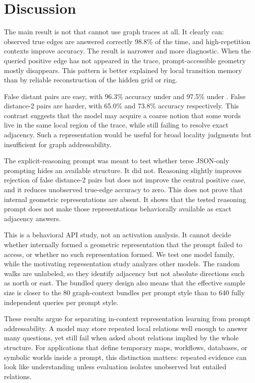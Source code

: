\section{Discussion}
\label{sec:discussion}

The main result is not that \gptfourone cannot use graph traces at all. It clearly can: observed true edges are answered correctly 98.8\% of the time, and high-repetition contexts improve accuracy. The result is narrower and more diagnostic. When the queried positive edge has not appeared in the trace, prompt-accessible geometry mostly disappears. This pattern is better explained by local transition memory than by reliable reconstruction of the hidden grid or ring.

False distant pairs are easy, with 96.3\% accuracy under \directprompt and 97.5\% under \reasonprompt. False distance-2 pairs are harder, with 65.0\% and 73.8\% accuracy respectively. This contrast suggests that the model may acquire a coarse notion that some words live in the same local region of the trace, while still failing to resolve exact adjacency. Such a representation would be useful for broad locality judgments but insufficient for graph addressability.

The explicit-reasoning prompt was meant to test whether terse JSON-only prompting hides an available structure. It did not. Reasoning slightly improves rejection of false distance-2 pairs but does not improve the central positive case, and it reduces unobserved true-edge accuracy to zero. This does not prove that internal geometric representations are absent. It shows that the tested reasoning prompt does not make those representations behaviorally available as exact adjacency answers.

This is a behavioral API study, not an activation analysis. It cannot decide whether \gptfourone internally formed a geometric representation that the prompt failed to access, or whether no such representation formed. We test one model family, while the motivating representation study analyzes other models. The random walks are unlabeled, so they identify adjacency but not absolute directions such as north or east. The bundled query design also means that the effective sample size is closer to the 80 graph-context bundles per prompt style than to 640 fully independent queries per prompt style.

These results argue for separating in-context representation learning from prompt addressability. A model may store repeated local relations well enough to answer many questions, yet still fail when asked about relations implied by the whole structure. For applications that define temporary maps, workflows, databases, or symbolic worlds inside a prompt, this distinction matters: repeated evidence can look like understanding unless evaluation isolates unobserved but entailed relations.
